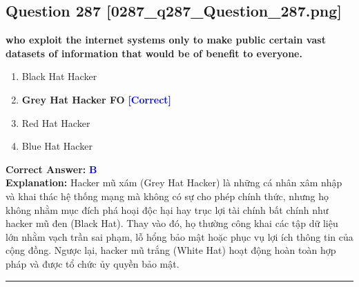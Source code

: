 \documentclass[11pt,a4paper]{article}
\begin{document}
\begin{minipage}{\textwidth}
\subsection*{Question 287 \quad \footnotesize{[0287\_q287\_Question\_287.png]}}
\noindent \textbf{who exploit the internet systems only to make public certain vast datasets of information that would be of benefit to everyone.}

\begin{enumerate}[label=\Alph*.]
    \item Black Hat Hacker
    \item \textbf{Grey Hat Hacker FO} \hfill \textcolor{blue}{\textbf{[Correct]}}
    \item Red Hat Hacker
    \item Blue Hat Hacker
\end{enumerate}

\noindent \textbf{Correct Answer:} \textcolor{blue}{\textbf{B}} \\[2pt]
\noindent \textbf{Explanation:} Hacker mũ xám (Grey Hat Hacker) là những cá nhân xâm nhập và khai thác hệ thống mạng mà không có sự cho phép chính thức, nhưng họ không nhằm mục đích phá hoại độc hại hay trục lợi tài chính bất chính như hacker mũ đen (Black Hat). Thay vào đó, họ thường công khai các tập dữ liệu lớn nhằm vạch trần sai phạm, lỗ hổng bảo mật hoặc phục vụ lợi ích thông tin của cộng đồng. Ngược lại, hacker mũ trắng (White Hat) hoạt động hoàn toàn hợp pháp và được tổ chức ủy quyền bảo mật.

\par\vspace{0.3cm}
\hrule
\vspace{0.3cm}
\end{minipage}
\end{document}
